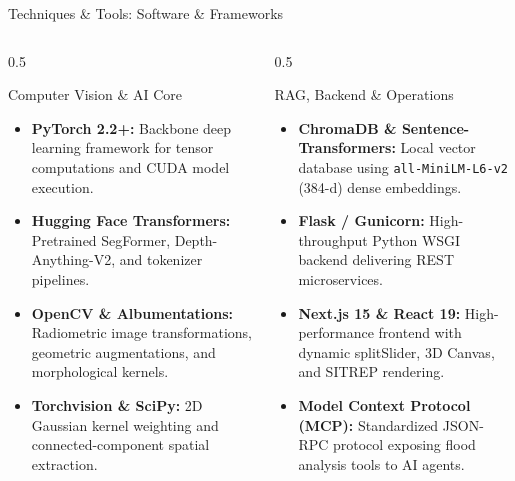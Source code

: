 \documentclass[aspectratio=169, 10pt, professionalfonts]{beamer}
\begin{document}
\begin{frame}{Techniques \& Tools: Software \& Frameworks}
  \begin{columns}[T]
    \begin{column}{0.5\textwidth}
      \begin{block}{Computer Vision \& AI Core}
        \begin{itemize}\setlength{\itemsep}{0.5em}\footnotesize
          \item \textbf{PyTorch 2.2+:} Backbone deep learning framework for tensor computations and CUDA model execution.
          \item \textbf{Hugging Face Transformers:} Pretrained SegFormer, Depth-Anything-V2, and tokenizer pipelines.
          \item \textbf{OpenCV \& Albumentations:} Radiometric image transformations, geometric augmentations, and morphological kernels.
          \item \textbf{Torchvision \& SciPy:} 2D Gaussian kernel weighting and connected-component spatial extraction.
        \end{itemize}
      \end{block}
    \end{column}
    
    \begin{column}{0.5\textwidth}
      \begin{block}{RAG, Backend \& Operations}
        \begin{itemize}\setlength{\itemsep}{0.5em}\footnotesize
          \item \textbf{ChromaDB \& Sentence-Transformers:} Local vector database using \texttt{all-MiniLM-L6-v2} (384-d) dense embeddings.
          \item \textbf{Flask / Gunicorn:} High-throughput Python WSGI backend delivering REST microservices.
          \item \textbf{Next.js 15 \& React 19:} High-performance frontend with dynamic splitSlider, 3D Canvas, and SITREP rendering.
          \item \textbf{Model Context Protocol (MCP):} Standardized JSON-RPC protocol exposing flood analysis tools to AI agents.
        \end{itemize}
      \end{block}
    \end{column}
  \end{columns}
\end{frame}
\end{document}
